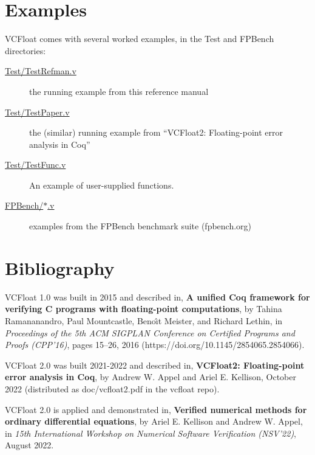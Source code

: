 \documentclass[article]{memoir}
\begin{document}
\chapter{Examples}

VCFloat comes with several worked examples, in the Test and FPBench directories:
\begin{description}
\item[\href{../Test/TestRefman.v}{Test/TestRefman.v}]  the running example from this reference manual
\item[\href{../Test/TestPaper.v}{Test/TestPaper.v}]  the (similar) running example from ``VCFloat2: Floating-point error analysis in Coq''
\item[\href{../Test/TestFunc.v}{Test/TestFunc.v}]  An example of user-supplied functions.
\item[\href{../FPBench/}{FPBench/$*$.v}]  examples from the FPBench benchmark suite (fpbench.org)
\end{description}

\chapter{Bibliography}

\quad VCFloat 1.0 was built in 2015 and described in,\newline
\textbf{A unified Coq framework for verifying C programs with floating-point computations}, by Tahina Ramananandro, Paul Mountcastle, Beno\^{\i}t  Meister, and Richard Lethin, in \emph{Proceedings of the 5th ACM SIGPLAN Conference on Certified Programs and Proofs (CPP'16)}, pages 15--26, 2016 (https://doi.org/10.1145/2854065.2854066).
\vspace\baselineskip

VCFloat 2.0 was built 2021-2022 and described in,\newline
\textbf{VCFloat2: Floating-point error analysis in Coq},
by Andrew W. Appel and Ariel E. Kellison,
October 2022  (distributed as doc/vcfloat2.pdf in the vcfloat repo).
\vspace\baselineskip

VCFloat 2.0 is applied and demonstrated in,\newline
\textbf{Verified numerical methods for ordinary differential equations},
by Ariel E. Kellison and Andrew W. Appel,
in \emph{15th International Workshop on Numerical Software Verification (NSV'22)}, August 2022.
\end{document}
